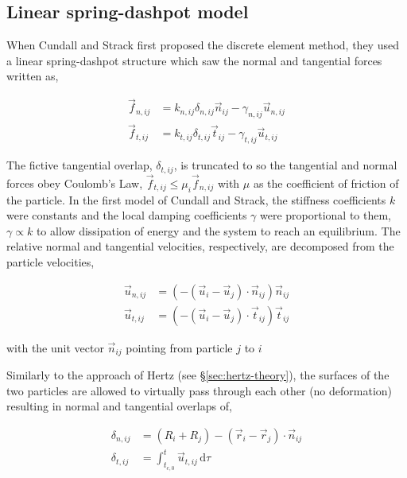 \subsection{Linear spring-dashpot model}

When Cundall and Strack first proposed the discrete element method, they used a linear spring-dashpot structure which saw the normal and tangential forces written as,

\begin{subequations}
\label{eq:dem-forces}
\begin{align}
	\vec{f}_{n,ij} &= k_{n,ij} \delta_{n,ij}\vec{n}_{ij} - \gamma_{n,ij} \vec{u}_{n,ij} 	\label{eq:normal-force} \\
	\vec{f}_{t,ij} &= k_{t,ij} \delta_{t,ij}\vec{t}_{ij} - \gamma_{t,ij} \vec{u}_{t,ij} 	\label{eq:tangential-force}
\end{align}
\end{subequations}

The fictive tangential overlap, $\delta_{t,ij}$, is truncated to so the tangential and normal forces obey Coulomb's Law, $\vec{f}_{t,ij} \le \mu_i \vec{f}_{n,ij}$ with $\mu$ as the coefficient of friction of the particle. In the first model of Cundall and Strack, the stiffness coefficients $k$ were constants and the local damping coefficients $\gamma$ were proportional to them, $\gamma \propto k$ to allow dissipation of energy and the system to reach an equilibrium. The relative normal and tangential velocities, respectively, are decomposed from the particle velocities,

\begin{subequations}
\label{eq:dem-velocities}
\begin{align}
	\vec{u}_{n,ij} &= (-(\vec{u}_i-\vec{u}_j)\cdot\vec{n}_{ij})\vec{n}_{ij} \\
	\vec{u}_{t,ij} &= (-(\vec{u}_i-\vec{u}_j)\cdot\vec{t}_{ij})\vec{t}_{ij}
\end{align}
\end{subequations}

with the unit vector $\vec{n}_{ij}$ pointing from particle $j$ to $i$

Similarly to the approach of Hertz (see \S\ref{sec:hertz-theory}), the surfaces of the two particles are allowed to virtually pass through each other (no deformation) resulting in normal and tangential overlaps of,

\begin{subequations}
\label{eq:dem-overlaps}
\begin{align}
	\delta_{n,ij} &= (R_i + R_j) - (\vec{r}_i -\vec{r}_j)\cdot \vec{n}_{ij} \\
	\delta_{t,ij} &= \int_{t_{c,0}}^{t} \vec{u}_{t,ij}\,\mathrm{d}\tau 
\end{align}
\end{subequations}

